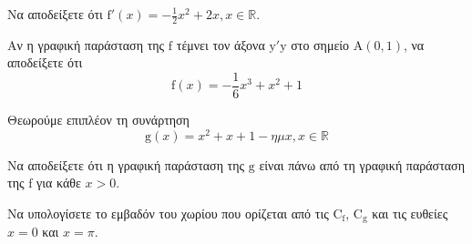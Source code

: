 \begin{alist}
    \item Να αποδείξετε ότι $\mathrm{f}'(x) = -\frac{1}{2}x^2 + 2x, x \in \mathbb{R}$. 
    \item Αν η γραφική παράσταση της $\mathrm{f}$ τέμνει τον άξονα $\mathrm{y}'\mathrm{y}$ στο σημείο $\mathrm{A}(0, 1)$, να αποδείξετε ότι
    \[ \mathrm{f}(x) = -\frac{1}{6}x^3 + x^2 + 1 \] 
\end{alist}
Θεωρούμε επιπλέον τη συνάρτηση
\[ \mathrm{g}(x) = x^2 + x + 1 - \eta \mu x, x \in \mathbb{R} \]
\begin{alist}
    \item \begin{rlist}
        \item Να αποδείξετε ότι η γραφική παράσταση της $\mathrm{g}$ είναι πάνω από τη γραφική παράσταση της $\mathrm{f}$ για κάθε $x > 0$. 
        \item Να υπολογίσετε το εμβαδόν του χωρίου που ορίζεται από τις $\mathrm{C_f}$, $\mathrm{C_g}$ και τις ευθείες $x = 0$ και $x = \pi$. 
    \end{rlist}
\end{alist}